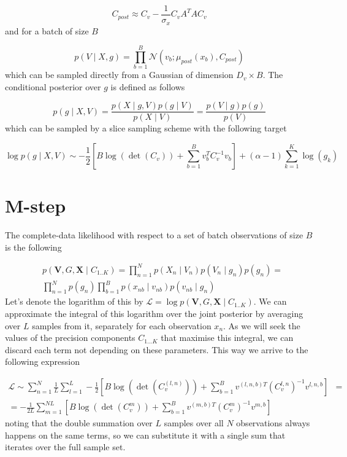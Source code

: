 \documentclass{paper}
\begin{document}
\begin{equation}
C_{post} \approx C_v - \frac{1}{\sigma_x}C_v A^T A C_v
\end{equation}
%
and for a batch of size $B$

\begin{equation}
p(V \mid X,g) = \prod_{b=1}^B \mathcal{N} \left(v_b; \mu_{post}(x_b),C_{post} \right)
\end{equation}
%
which can be sampled directly from a Gaussian of dimension $D_v \times B$. The conditional posterior over $g$ is defined as follows

\begin{equation} 
p(g \mid X,V) = \frac{p(X \mid g,V) p(g \mid V)}{p(X \mid V)} = \frac{p(V \mid g) p(g)}{p(V)}
\end{equation}
%
which can be sampled by a  slice sampling scheme with the following target

\begin{equation} 
\log p(g \mid X,V) \sim -\frac{1}{2} \left[B\log(\det(C_v)) + \sum_{b=1}^B v_b^T C_v^{-1} v_b\right] + (\alpha-1) \sum_{k=1}^K \log(g_k)
\end{equation}

\section{M-step}

The complete-data likelihood with respect to a set of batch observations of size $B$ is the following

\begin{equation}
\begin{split}
&p(\mathbf{V},G,\mathbf{X} \mid C_{1..K}) = \prod_{n=1}^N p(X_n \mid V_n) p(V_n \mid g_n) p(g_n) = \\
&\prod_{n=1}^N p(g_n) \prod_{b=1}^B p(x_{nb} \mid v_{nb}) p(v_{nb} \mid g_n) 
\end{split}
\end{equation}
%
Let's denote the logarithm of this by $\mathcal{L}=\log p(\mathbf{V},G,\mathbf{X} \mid C_{1..K})$. We can approximate the integral of this logarithm over the joint posterior by averaging over $L$ samples from it, separately for each observation $x_n$. As we will seek the values of the precision components $C_{1 \dots K}$ that maximise this integral, we can discard each term not depending on these parameters. This way we arrive to the following expression 

\begin{equation}
\begin{split}
\mathcal{L} \sim \sum_{n=1}^N \frac{1}{L} \sum_{l=1}^L -\frac{1}{2} \left[B \log \left( \det \left( C_v^{(l,n)} \right) \right) + \sum_{b=1}^B v^{(l,n,b)T}  \left( C_v^{l,n} \right)^{-1} v^{l,n,b}\right]& = \\
= -\frac{1}{2L} \sum_{m=1}^{NL} \left[B \log \left( \det \left( C_v^{m} \right) \right) + \sum_{b=1}^B v^{(m,b)T}  \left( C_v^{m} \right)^{-1} v^{m,b}\right]&
\end{split}
\end{equation}
%
noting that the double summation over $L$ samples over all $N$ observations always happens on the same terms, so we can substitute it with a single sum that iterates over the full sample set.
\end{document}
